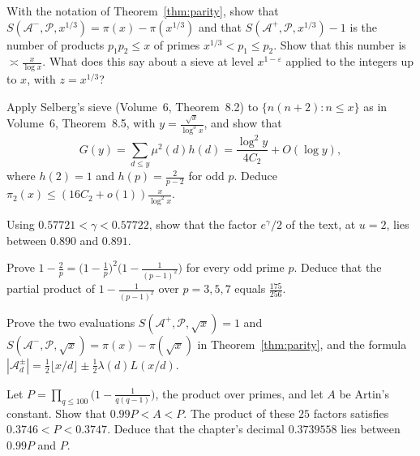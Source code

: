 \begin{exercise}[$\star\star$]\label{ex:p2}
With the notation of Theorem~\ref{thm:parity}, show that $S(\mathcal A^-,\mathcal P,x^{1/3})=\pi(x)-\pi(x^{1/3})$ and that $S(\mathcal A^+,\mathcal P,x^{1/3})-1$ is the number of products $p_1p_2\le x$ of primes $x^{1/3}<p_1\le p_2$. Show that this number is $\asymp\frac x{\log x}$. What does this say about a sieve at level $x^{1-\varepsilon}$ applied to the integers up to $x$, with $z=x^{1/3}$?
\end{exercise}

\begin{exercise}[$\star\star\star$]\label{ex:twins16}
Apply Selberg's sieve (Volume~6, Theorem~8.2) to $\{n(n+2):n\le x\}$ as in Volume~6, Theorem~8.5, with $y=\frac{\sqrt x}{\log^3x}$, and show that
\[
G(y)=\sum_{d\le y}\mu^2(d)h(d)=\frac{\log^2y}{4C_2}+O(\log y),
\]
where $h(2)=1$ and $h(p)=\frac2{p-2}$ for odd $p$. Deduce $\pi_2(x)\le(16C_2+o(1))\frac x{\log^2x}$.
\end{exercise}

\begin{exercise}[$\star$]\label{ex:v14-extra-03-1}
Using $0.57721<\gamma<0.57722$, show that the factor $e^\gamma/2$ of the text, at $u=2$, lies between $0.890$ and $0.891$.
\end{exercise}

\begin{exercise}[$\star$]\label{ex:v14-extra-03-2}
Prove $1-\frac2p=\bigl(1-\frac1p\bigr)^2\bigl(1-\frac1{(p-1)^2}\bigr)$ for every odd prime $p$. Deduce that the partial product of $1-\frac1{(p-1)^2}$ over $p=3,5,7$ equals $\frac{175}{256}$.
\end{exercise}

\begin{exercise}[$\star\star$]\label{ex:v14-extra-03-3}
Prove the two evaluations $S(\mathcal A^+,\mathcal P,\sqrt x)=1$ and $S(\mathcal A^-,\mathcal P,\sqrt x)=\pi(x)-\pi(\sqrt x)$ in Theorem~\ref{thm:parity}, and the formula $|\mathcal A^\pm_d|=\frac12\lfloor x/d\rfloor\pm\frac12\lambda(d)L(x/d)$.
\end{exercise}

\begin{exercise}[$\star\star\star$]\label{ex:v14-extra-03-4}
Let $P=\prod_{q\le100}\bigl(1-\frac1{q(q-1)}\bigr)$, the product over primes, and let $A$ be Artin's constant. Show that $0.99P<A<P$. The product of these $25$ factors satisfies $0.3746<P<0.3747$. Deduce that the chapter's decimal $0.3739558$ lies between $0.99P$ and $P$.
\end{exercise}


